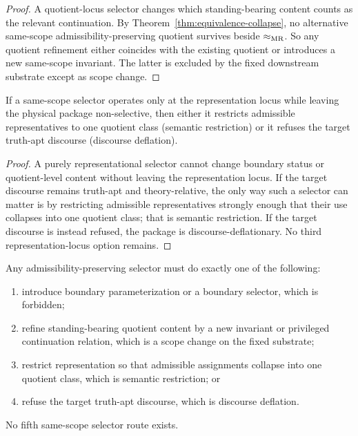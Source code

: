 \begin{proof}
A quotient-locus selector changes which standing-bearing content counts as the relevant continuation.
By Theorem~\ref{thm:equivalence-collapse}, no alternative same-scope admissibility-preserving
quotient survives beside $\mathrel{\approx_{\mathrm{MR}}}$. So any quotient refinement either coincides with the existing
quotient or introduces a new same-scope invariant. The latter is excluded by the fixed downstream
substrate except as scope change.
\end{proof}

\begin{corollary}
\label{cor:representation-restriction-semantic-or-deflation}
If a same-scope selector operates only at the representation locus while leaving the physical package
non-selective, then either it restricts admissible representatives to one quotient class (semantic
restriction) or it refuses the target truth-apt discourse (discourse deflation).
\end{corollary}

\begin{proof}
A purely representational selector cannot change boundary status or quotient-level content without
leaving the representation locus. If the target discourse remains truth-apt and theory-relative, the only
way such a selector can matter is by restricting admissible representatives strongly enough that their
use collapses into one quotient class; that is semantic restriction. If the target discourse is instead
refused, the package is discourse-deflationary. No third representation-locus option remains.
\end{proof}

\begin{theorem}
\label{thm:selector-exhaustion}
Any admissibility-preserving selector must do exactly one of the following:
\begin{enumerate}
    \item introduce boundary parameterization or a boundary selector, which is forbidden;
    \item refine standing-bearing quotient content by a new invariant or privileged continuation
    relation, which is a scope change on the fixed substrate;
    \item restrict representation so that admissible assignments collapse into one quotient class,
    which is semantic restriction; or
    \item refuse the target truth-apt discourse, which is discourse deflation.
\end{enumerate}
No fifth same-scope selector route exists.
\end{theorem}

